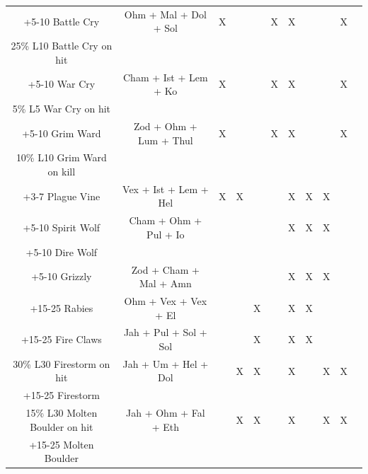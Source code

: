 \documentclass[12pt,a4paper]{article}
\begin{document}
\begin{center}
{\begin{tabular}{|c|c|c|c|c|c|c|c|c|c|c|}
\hline
+5-10 Battle Cry&Ohm + Mal + Dol + Sol&X&&&X&X&&&X&\\
25\% L10 Battle Cry on hit&&&&&&&&&&\\
\hline
+5-10 War Cry&Cham + Ist + Lem + Ko&X&&&X&X&&&X&\\
5\% L5 War Cry on hit&&&&&&&&&&\\
\hline
+5-10 Grim Ward&Zod + Ohm + Lum + Thul&X&&&X&X&&&X&\\
10\% L10 Grim Ward on kill&&&&&&&&&&\\
\hline
+3-7 Plague Vine&Vex + Ist + Lem + Hel&X&X&&&X&X&X&&\\
\hline
+5-10 Spirit Wolf&Cham + Ohm + Pul + Io&&&&&X&X&X&&\\
+5-10 Dire Wolf&&&&&&&&&&\\
\hline
+5-10 Grizzly&Zod + Cham + Mal + Amn&&&&&X&X&X&&\\
\hline
+15-25 Rabies&Ohm + Vex + Vex + El&&&X&&X&X&&&\\
\hline
+15-25 Fire Claws&Jah + Pul + Sol + Sol&&&X&&X&X&&&\\
\hline
30\% L30 Firestorm on hit&Jah + Um + Hel + Dol&&X&X&&X&&X&X&\\
+15-25 Firestorm&&&&&&&&&&\\
\hline
15\% L30 Molten Boulder on hit&Jah + Ohm + Fal + Eth&&X&X&&X&&X&X&\\
+15-25 Molten Boulder&&&&&&&&&&\\
\hline
\end{tabular}
}
\end{center}
\end{document}
